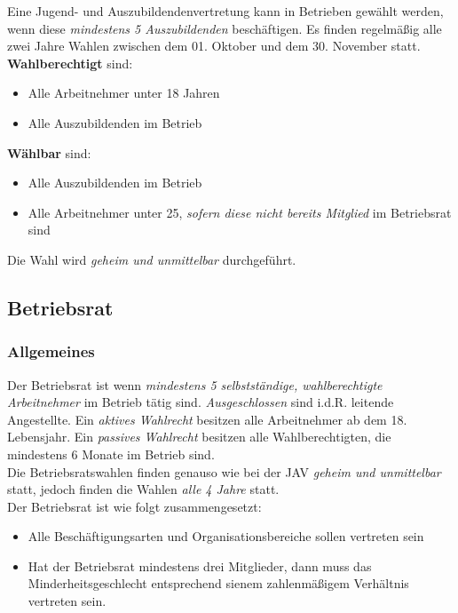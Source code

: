\documentclass[a4paper, 12pt]{report}
\begin{document}
Eine Jugend- und Auszubildendenvertretung kann in Betrieben gewählt werden,
wenn diese \emph{mindestens 5 Auszubildenden} beschäftigen. Es finden
regelmäßig alle zwei Jahre  Wahlen zwischen dem 01. Oktober und dem 30. November
statt. \\

\textbf{Wahlberechtigt} sind:

\begin{itemize}
    \item Alle Arbeitnehmer unter 18 Jahren
    \item Alle Auszubildenden im Betrieb
\end{itemize}

\textbf{Wählbar} sind:
\begin{itemize}
    \item Alle Auszubildenden im Betrieb
    \item Alle Arbeitnehmer unter 25, \emph{sofern diese nicht bereits Mitglied}
	im Betriebsrat sind
\end{itemize}

Die Wahl wird \emph{geheim und unmittelbar} durchgeführt.

\newpage
\subsection{Betriebsrat}

\subsubsection{Allgemeines}

Der Betriebsrat ist wenn \emph{mindestens 5 selbstständige, wahlberechtigte
Arbeitnehmer} im Betrieb tätig sind. \emph{Ausgeschlossen} sind i.d.R. leitende
Angestellte. Ein \emph{aktives Wahlrecht} besitzen alle Arbeitnehmer ab dem 18.
Lebensjahr. Ein \emph{passives Wahlrecht} besitzen alle Wahlberechtigten, die
mindestens 6 Monate im Betrieb sind. \\

Die Betriebsratswahlen finden genauso wie bei der JAV \emph{geheim und
unmittelbar} statt, jedoch finden die Wahlen \emph{alle 4 Jahre} statt. \\

Der Betriebsrat ist wie folgt zusammengesetzt:

\begin{itemize}
    \item Alle Beschäftigungsarten und Organisationsbereiche sollen vertreten
	sein
    \item Hat der Betriebsrat mindestens drei Mitglieder, dann muss das
	Minderheitsgeschlecht entsprechend sienem zahlenmäßigem Verhältnis
	vertreten sein.
\end{itemize}
\end{document}
